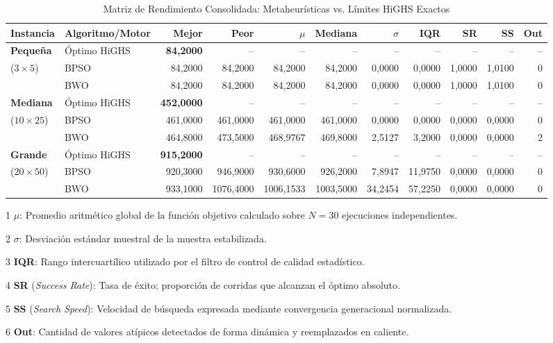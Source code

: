 \documentclass[final,5p,times,twocolumn]{elsarticle}
\begin{document}
\begin{table}[t]
\centering
\caption{Matriz de Rendimiento Consolidada: Metaheurísticas vs. Límites HiGHS Exactos}
\label{tab:descriptive_metrics}
\small
\begin{threeparttable}
\begin{tabular}{llrrrrrrrrr}
\toprule
\textbf{Instancia} & \textbf{Algoritmo/Motor} & \textbf{Mejor} & \textbf{Peor} & \textbf{$\mu$\tnote{1}} & \textbf{Mediana} & \textbf{$\sigma$\tnote{2}} & \textbf{IQR\tnote{3}} & \textbf{SR\tnote{4}} & \textbf{SS\tnote{5}} & \textbf{Out\tnote{6}} \\
\midrule
\textbf{Pequeña} & Óptimo HiGHS & \textbf{84,2000} & -- & -- & -- & -- & -- & -- & -- & -- \\
($3 \times 5$) & BPSO & 84,2000 & 84,2000 & 84,2000 & 84,2000 & 0,0000 & 0,0000 & 1,0000 & 1,0100 & 0 \\
 & BWO & 84,2000 & 84,2000 & 84,2000 & 84,2000 & 0,0000 & 0,0000 & 1,0000 & 1,0100 & 0 \\
\midrule
\textbf{Mediana} & Óptimo HiGHS & \textbf{452,0000} & -- & -- & -- & -- & -- & -- & -- & -- \\
($10 \times 25$) & BPSO & 461,0000 & 461,0000 & 461,0000 & 461,0000 & 0,0000 & 0,0000 & 0,0000 & 0,0000 & 0 \\
 & BWO & 464,8000 & 473,5000 & 468,9767 & 469,8000 & 2,5127 & 3,2000 & 0,0000 & 0,0000 & 2 \\
\midrule
\textbf{Grande} & Óptimo HiGHS & \textbf{915,2000} & -- & -- & -- & -- & -- & -- & -- & -- \\
($20 \times 50$) & BPSO & 920,3000 & 946,9000 & 930,6000 & 926,2000 & 7,8947 & 11,9750 & 0,0000 & 0,0000 & 0 \\
 & BWO & 933,1000 & 1076,4000 & 1006,1533 & 1003,5000 & 34,2454 & 57,2250 & 0,0000 & 0,0000 & 0 \\
\bottomrule
\end{tabular}

\begin{tablenotes}\footnotesize
    \item[1] \textbf{$\mu$}: Promedio aritmético global de la función objetivo calculado sobre $N=30$ ejecuciones independientes.
    \item[2] \textbf{$\sigma$}: Desviación estándar muestral de la muestra estabilizada.
    \item[3] \textbf{IQR}: Rango intercuartílico utilizado por el filtro de control de calidad estadístico.
    \item[4] \textbf{SR} (\textit{Success Rate}): Tasa de éxito; proporción de corridas que alcanzan el óptimo absoluto.
    \item[5] \textbf{SS} (\textit{Search Speed}): Velocidad de búsqueda expresada mediante convergencia generacional normalizada.
    \item[6] \textbf{Out}: Cantidad de valores atípicos detectados de forma dinámica y reemplazados en caliente.
\end{tablenotes}
\end{threeparttable}
\end{table}
\end{document}
